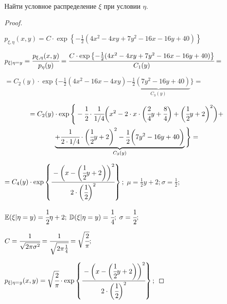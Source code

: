 \begin{problem}      
	Найти условное распределение $\xi$ при условии $\eta$. 
\end{problem}

\begin{proof}	
	$ $
	
	\large $ p_{\xi,\eta}(x, y) = C \cdot \exp \left\{-\frac12(4x^2 - 4xy + 7y^2 - 16x - 16y + 40)\right\} $
	
	$ p_{\xi|\eta=y}=\cfrac{p_{\xi,\eta}(x, y)}{p_{\eta}(y)}= \cfrac{C \cdot \exp \left\{-\frac12(4x^2 - 4xy + 7y^2 - 16x - 16y + 40)\right\}}{C_1(y)}= $
	
	$ =C_2(y) \cdot \exp \{-\frac12(4x^2-16x-4xy)\underbrace{-\frac12(7y^2-16y+40)}_{C_3(y)}\}= $
	
	\begin{multline}	
	=C_2(y) \cdot \exp \Bigg\{-\cfrac12\cdot\cfrac1{1/4}\bigg(x^2-2\cdot x\cdot\bigg(\cfrac24y+\cfrac84\bigg)+\bigg(\cfrac12 y+2\bigg)^2\bigg)+\\\underbrace{+\cfrac1{2\cdot 1/4}\cdot\bigg(\cfrac12y+2\bigg)^2 -\frac12\bigg(7y^2-16y+40\bigg)}_{C_3(y)}\Bigg\}=
	\end{multline}

	\large $ =C_4(y) \cdot \exp \left\{\cfrac{-\bigg(x-\bigg(\cfrac12 y+2\bigg)\bigg)^2}{2\cdot\bigg(\cfrac12\bigg)^2}\right\}; $ \Large $ \mu=\frac12y+2; \sigma=\frac12; $ \large
	
	$ \mathbb E(\xi|\eta=y)=\cfrac12\eta+2; $ 	
	$ \mathbb D(\xi|\eta=y)=\cfrac14; $ 	
	$ \sigma=\cfrac12; $ 
	
	$ C = \cfrac1{\sqrt{2\pi\sigma^2}}=\cfrac1{\sqrt{2\pi\frac14}}=\sqrt{\cfrac2{\pi}}; $
	
	$ p_{\xi|\eta=y}(x, y)=\sqrt{\cfrac2{\pi}}\cdot \exp \left\{\cfrac{-\bigg(x-\bigg(\cfrac12 y+2\bigg)\bigg)^2}{2\cdot\bigg(\cfrac12\bigg)^2}\right\}; $
	
\end{proof}







